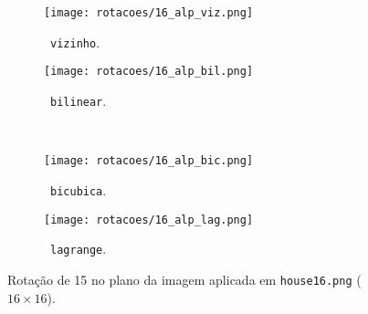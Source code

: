 \begin{figure}[H]
    \centering
    \begin{subfigure}{0.25\textwidth}
        \centering
        \texttt{[image: rotacoes/16\_alp\_viz.png]}
        \caption{~\texttt{vizinho}.}
    \end{subfigure}%
    \hspace{8pt}%
    \begin{subfigure}{0.25\textwidth}
        \centering
        \texttt{[image: rotacoes/16\_alp\_bil.png]}
        \caption{~\texttt{bilinear}.}
    \end{subfigure}
    \\[8pt]
    \begin{subfigure}{0.25\textwidth}
        \centering
        \texttt{[image: rotacoes/16\_alp\_bic.png]}
        \caption{~\texttt{bicubica}.}
    \end{subfigure}%
    \hspace{8pt}%
    \begin{subfigure}{0.25\textwidth}
        \centering
        \texttt{[image: rotacoes/16\_alp\_lag.png]}
        \caption{~\texttt{lagrange}.}
    \end{subfigure}

    \caption{Rotação de 15\textdegree{} no plano da imagem aplicada em \texttt{house16.png} ($16 \times 16$).}
    \label{fig:house16:alp}
\end{figure}